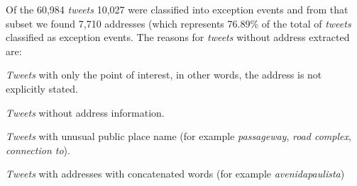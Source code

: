 \documentclass[runningheads]{llncs}
\begin{document}
\begin{table}[!htb]
\centering
\caption {Metrics of the evaluations of the algorithms used to classify the \textit {tweets} in exception events}
\label {tab:metrics}
\end{table}


Of the 60,984 \textit{tweets} 10,027 were classified into exception events and from that subset we found 7,710 addresses
(which represents 76.89\% of the total of \textit{tweets} classified as exception events. The reasons for \textit {tweets} without address extracted are:

\begin{enumerate*}
\item \textit{Tweets} with only the point of interest, in other words, the address is not explicitly stated.
\item \textit{Tweets} without address information.
\item \textit{Tweets} with unusual public place name (for example \emph{passageway}, \emph{road complex}, \emph{connection to}).
\item \textit{Tweets} with addresses with concatenated words (for example \emph{avenidapaulista})
\end{enumerate*}
\end{document}
